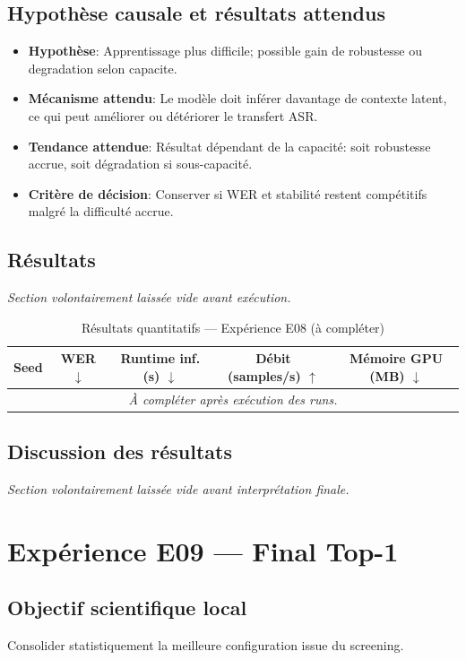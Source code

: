 \documentclass[11pt,a4paper]{article}
\begin{document}
\subsection{Hypothèse causale et résultats attendus}
\begin{itemize}[leftmargin=1.2cm]
\item \textbf{Hypothèse}: Apprentissage plus difficile; possible gain de robustesse ou degradation selon capacite.
\item \textbf{Mécanisme attendu}: Le modèle doit inférer davantage de contexte latent, ce qui peut améliorer ou détériorer le transfert ASR.
\item \textbf{Tendance attendue}: Résultat dépendant de la capacité: soit robustesse accrue, soit dégradation si sous-capacité.
\item \textbf{Critère de décision}: Conserver si WER et stabilité restent compétitifs malgré la difficulté accrue.
\end{itemize}

\subsection{Résultats}
\textit{Section volontairement laissée vide avant exécution.}

\begin{table}[H]
\centering
\caption{Résultats quantitatifs --- Expérience E08 (à compléter)}
\begin{tabular}{lcccc}
\toprule
Seed & WER $\downarrow$ & Runtime inf. (s) $\downarrow$ & Débit (samples/s) $\uparrow$ & Mémoire GPU (MB) $\downarrow$ \\
\midrule
\multicolumn{5}{c}{\textit{À compléter après exécution des runs.}} \\
\bottomrule
\end{tabular}
\end{table}

\subsection{Discussion des résultats}
\textit{Section volontairement laissée vide avant interprétation finale.}


\section{Expérience E09 --- Final Top-1}
\subsection{Objectif scientifique local}
Consolider statistiquement la meilleure configuration issue du screening.
\end{document}
